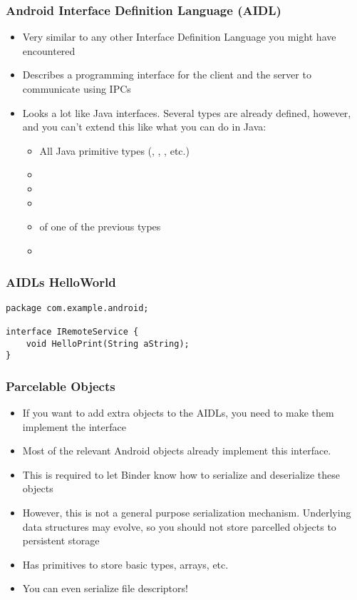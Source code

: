 \begin{frame}
  \frametitle{Android Interface Definition Language (AIDL)}
  \begin{itemize}
  \item Very similar to any other Interface Definition Language you
    might have encountered
  \item Describes a programming interface for the client and the
    server to communicate using IPCs
  \item Looks a lot like Java interfaces. Several types are already
    defined, however, and you can't extend this like what you can do in
    Java:
    \begin{itemize}
    \item All Java primitive types (, ,
      , etc.)
    \item {}
    \item {}
    \item {}
    \item {} of one of the previous types
    \item {}
    \end{itemize}
  \end{itemize}
\end{frame}

\begin{frame}[fragile]
  \frametitle{AIDLs HelloWorld}
\begin{verbatim}
package com.example.android;

interface IRemoteService {
    void HelloPrint(String aString);
}
\end{verbatim}
\end{frame}

\begin{frame}
  \frametitle{Parcelable Objects}
  \begin{itemize}
  \item If you want to add extra objects to the AIDLs, you need to
    make them implement the  interface
  \item Most of the relevant Android objects already implement this interface.
  \item This is required to let Binder know how to serialize and
    deserialize these objects
  \item However, this is not a general purpose serialization
    mechanism. Underlying data structures may evolve, so you should
    not store parcelled objects to persistent storage
  \item Has primitives to store basic types, arrays, etc.
  \item You can even serialize file descriptors!
  \end{itemize}
\end{frame}

